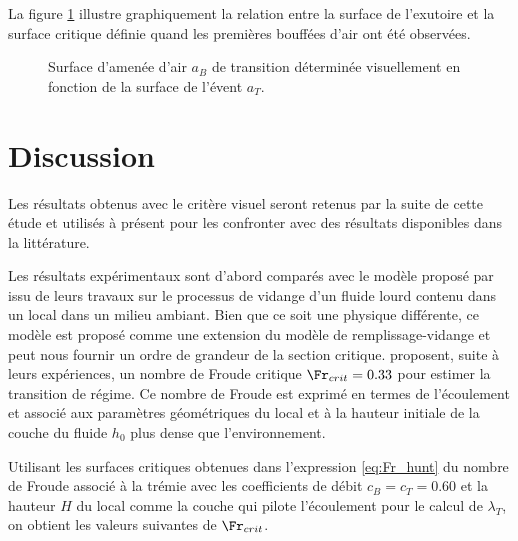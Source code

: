La figure \ref{fig:ab_bidi_visu} illustre graphiquement la relation entre la surface de l'exutoire et la surface critique définie quand les premières bouffées d'air ont été observées. 

\begin{figure}
\centering
\resizebox{0.7\textwidth}{!}{}
\caption{Surface d'amenée d'air $a_B$ de transition déterminée visuellement en fonction de la surface de l'évent $a_T$.}
\label{fig:ab_bidi_visu}
\end{figure}

\section{Discussion}
Les résultats obtenus avec le critère visuel seront retenus par la suite de cette étude et utilisés à présent pour les confronter avec des résultats disponibles dans la littérature.

Les résultats expérimentaux sont d'abord comparés avec le modèle proposé par \textcite{hunt_coffey_2010} issu de leurs travaux sur le processus de vidange d'un fluide lourd contenu dans un local dans un milieu ambiant. Bien que ce soit une physique différente, ce modèle est proposé comme une extension du modèle de remplissage-vidange et peut nous fournir un ordre de grandeur de la section critique. \textcite{hunt_coffey_2010} proposent, suite à leurs expériences, un nombre de Froude critique $\Fr_{crit}=0.33$ pour estimer la transition de régime. Ce nombre de Froude est exprimé en termes de l'écoulement et associé aux paramètres géométriques du local et à la hauteur initiale de la couche du fluide $h_0$ plus dense que l'environnement.

Utilisant les surfaces critiques obtenues dans l'expression \eqref{eq:Fr_hunt} du nombre de Froude associé à la trémie avec les coefficients de débit $c_B=c_T=0.60$ et la hauteur $H$ du local comme la couche qui pilote l'écoulement pour le calcul de $\lambda_T$, on obtient les valeurs suivantes de $\Fr_{crit}$.

